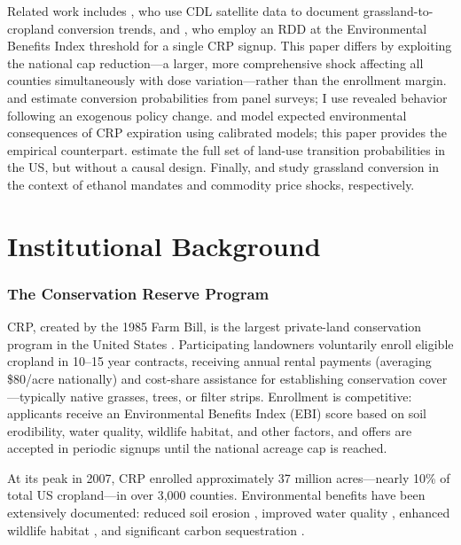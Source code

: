 \documentclass[12pt]{article}
\begin{document}
Related work includes \citet{morefield2016grasslands}, who use CDL satellite data to document grassland-to-cropland conversion trends, and \citet{rosenberg2024crp}, who employ an RDD at the Environmental Benefits Index threshold for a single CRP signup. This paper differs by exploiting the national cap reduction---a larger, more comprehensive shock affecting all counties simultaneously with dose variation---rather than the enrollment margin. \citet{hendricks2014potential} and \citet{ifft2018potential} estimate conversion probabilities from panel surveys; I use revealed behavior following an exogenous policy change. \citet{secchi2011potential} and \citet{claassen2011grassland} model expected environmental consequences of CRP expiration using calibrated models; this paper provides the empirical counterpart. \citet{lubowski2008environmental} estimate the full set of land-use transition probabilities in the US, but without a causal design. Finally, \citet{wu2005grassland} and \citet{yu2018grassland} study grassland conversion in the context of ethanol mandates and commodity price shocks, respectively.

\section{Institutional Background}

\subsubsection*{The Conservation Reserve Program} CRP, created by the 1985 Farm Bill, is the largest private-land conservation program in the United States \citep{hellerstein2017national}. Participating landowners voluntarily enroll eligible cropland in 10--15 year contracts, receiving annual rental payments (averaging \$80/acre nationally) and cost-share assistance for establishing conservation cover---typically native grasses, trees, or filter strips. Enrollment is competitive: applicants receive an Environmental Benefits Index (EBI) score based on soil erodibility, water quality, wildlife habitat, and other factors, and offers are accepted in periodic signups until the national acreage cap is reached.

At its peak in 2007, CRP enrolled approximately 37 million acres---nearly 10\% of total US cropland---in over 3,000 counties. Environmental benefits have been extensively documented: reduced soil erosion \citep{sullivan2004design}, improved water quality \citep{johnson2016agricultural}, enhanced wildlife habitat \citep{reynolds2001changes}, and significant carbon sequestration \citep{gebhart2004economics}.
\end{document}
